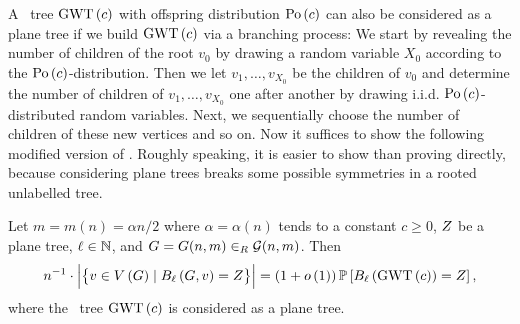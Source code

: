 A \GW\ tree $\operatorname{GWT}\left(c\right)$ with offspring distribution $\operatorname{Po}\left(c\right)$ can also be considered as a plane tree if we build $\operatorname{GWT}\left(c\right)$ via a branching process: We start by revealing the number of children of the root $v_0$ by drawing a random variable $X_0$ according to the $\operatorname{Po}\left(c\right)$-distribution. Then we let $v_1, \ldots, v_{X_0}$ be the children of $v_0$ and determine the number of children of $v_1, \ldots, v_{X_0}$ one after another by drawing i.i.d. $\operatorname{Po}\left(c\right)$-distributed random variables. Next, we sequentially choose the number of children of these new vertices and so on. Now it suffices to show the following modified version of . Roughly speaking, it is easier to show  than proving  directly, because considering plane trees breaks some possible symmetries in a rooted unlabelled tree. 
\begin{lem}\label{LSlem:local_er2}
	Let $m=m(n)=\alpha n/2$ where $\alpha=\alpha(n)$ tends to a constant $c\geq 0$, $Z$ be a plane tree, $\ell\in\mathbb{N}$, and $G=G(n,m)\in_R\mathcal{G}(n,m)$. Then \whp
	\begin{align*}
		n^{-1}\cdot\Big|\big\{v\in V\left(G\right) \mid B_{\ell}\left(G, v\right)=Z\big\}\Big|=\left(1+o\left(1\right)\right)\mathbb{P}\left[B_{\ell}\left(\operatorname{GWT}\left(c\right)\right)=Z\right],
	\end{align*}
where the \GW\ tree $\operatorname{GWT}\left(c\right)$ is considered as a plane tree.
\end{lem}
